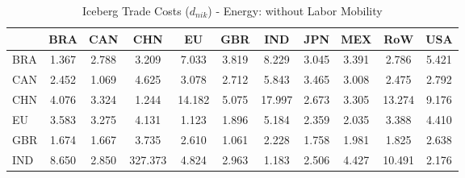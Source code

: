 \begin{table}[htbp]
\centering
\caption{Iceberg Trade Costs ($d_{nik}$) - Energy: without Labor Mobility} 
\label{tab:iceberg_Energy}
\begin{tabular}{lcccccccccc}
  \hline
 & BRA & CAN & CHN & EU & GBR & IND & JPN & MEX & RoW & USA \\ 
  \hline
BRA & \textcolor[RGB]{232,150,23}{1.367} & \textcolor[RGB]{148,96,107}{2.788} & \textcolor[RGB]{107,69,148}{3.209} & \textcolor[RGB]{20,13,235}{7.033} & \textcolor[RGB]{71,46,184}{3.819} & \textcolor[RGB]{18,12,237}{8.229} & \textcolor[RGB]{120,78,135}{3.045} & \textcolor[RGB]{89,58,166}{3.391} & \textcolor[RGB]{150,97,105}{2.786} & \textcolor[RGB]{31,20,224}{5.421} \\ 
  CAN & \textcolor[RGB]{184,119,71}{2.452} & \textcolor[RGB]{250,162,5}{1.069} & \textcolor[RGB]{46,30,209}{4.625} & \textcolor[RGB]{117,76,138}{3.078} & \textcolor[RGB]{153,99,102}{2.712} & \textcolor[RGB]{28,18,227}{5.843} & \textcolor[RGB]{84,54,171}{3.465} & \textcolor[RGB]{128,82,128}{3.008} & \textcolor[RGB]{181,117,74}{2.475} & \textcolor[RGB]{145,94,110}{2.792} \\ 
  CHN & \textcolor[RGB]{61,40,194}{4.076} & \textcolor[RGB]{97,63,158}{3.324} & \textcolor[RGB]{235,152,20}{1.244} & \textcolor[RGB]{5,3,250}{14.182} & \textcolor[RGB]{36,23,219}{5.075} & \textcolor[RGB]{3,2,252}{17.997} & \textcolor[RGB]{158,102,97}{2.673} & \textcolor[RGB]{99,64,156}{3.305} & \textcolor[RGB]{8,5,247}{13.274} & \textcolor[RGB]{13,8,242}{9.176} \\ 
  EU & \textcolor[RGB]{82,53,173}{3.583} & \textcolor[RGB]{102,66,153}{3.275} & \textcolor[RGB]{59,38,196}{4.131} & \textcolor[RGB]{245,158,10}{1.123} & \textcolor[RGB]{214,139,41}{1.896} & \textcolor[RGB]{33,21,222}{5.184} & \textcolor[RGB]{189,122,66}{2.359} & \textcolor[RGB]{201,130,54}{2.035} & \textcolor[RGB]{92,59,163}{3.388} & \textcolor[RGB]{56,36,199}{4.410} \\ 
  GBR & \textcolor[RGB]{224,145,31}{1.674} & \textcolor[RGB]{227,147,28}{1.667} & \textcolor[RGB]{77,50,178}{3.735} & \textcolor[RGB]{168,109,87}{2.610} & \textcolor[RGB]{252,163,3}{1.061} & \textcolor[RGB]{191,124,64}{2.228} & \textcolor[RGB]{219,142,36}{1.758} & \textcolor[RGB]{204,132,51}{1.981} & \textcolor[RGB]{217,140,38}{1.825} & \textcolor[RGB]{166,107,89}{2.638} \\ 
  IND & \textcolor[RGB]{15,10,240}{8.650} & \textcolor[RGB]{140,91,115}{2.850} & \textcolor[RGB]{0,0,255}{327.373} & \textcolor[RGB]{43,28,212}{4.824} & \textcolor[RGB]{133,86,122}{2.963} & \textcolor[RGB]{242,157,13}{1.183} & \textcolor[RGB]{178,115,76}{2.506} & \textcolor[RGB]{54,35,201}{4.427} & \textcolor[RGB]{10,7,245}{10.491} & \textcolor[RGB]{199,129,56}{2.176} \\ 

\end{tabular}
\end{table}
